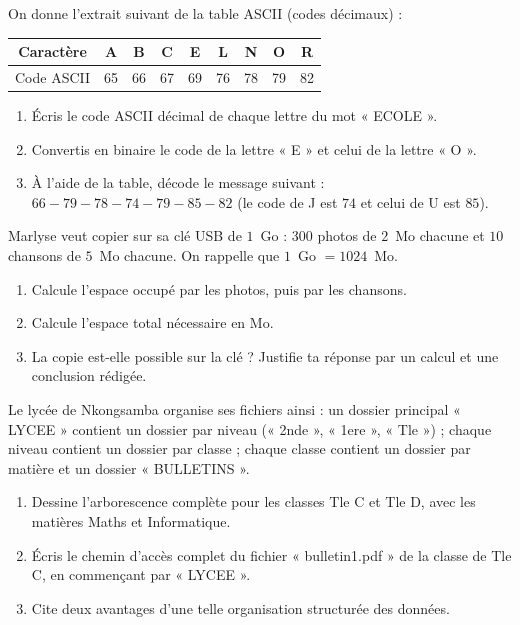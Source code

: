 \documentclass[11pt]{article}
\begin{document}
\begin{exercice}
On donne l'extrait suivant de la table ASCII (codes décimaux) :
\begin{center}
\begin{tabular}{|c|c|c|c|c|c|c|c|c|}
\hline
\rowcolor{popblueL} Caractère & A & B & C & E & L & N & O & R \\
\hline
Code ASCII & 65 & 66 & 67 & 69 & 76 & 78 & 79 & 82 \\
\hline
\end{tabular}
\end{center}
\begin{enumerate}
\item Écris le code ASCII décimal de chaque lettre du mot « ECOLE ».
\item Convertis en binaire le code de la lettre « E » et celui de la lettre « O ».
\item À l'aide de la table, décode le message suivant : $66 - 79 - 78 - 74 - 79 - 85 - 82$ (le code de J est $74$ et celui de U est $85$).
\end{enumerate}
\end{exercice}

\begin{exercice}
Marlyse veut copier sur sa clé USB de $1$~Go : $300$ photos de $2$~Mo chacune et $10$ chansons de $5$~Mo chacune. On rappelle que $1$~Go $= 1024$~Mo.
\begin{enumerate}
\item Calcule l'espace occupé par les photos, puis par les chansons.
\item Calcule l'espace total nécessaire en Mo.
\item La copie est-elle possible sur la clé ? Justifie ta réponse par un calcul et une conclusion rédigée.
\end{enumerate}
\end{exercice}

\begin{exercice}
Le lycée de Nkongsamba organise ses fichiers ainsi : un dossier principal « LYCEE » contient un dossier par niveau (« 2nde », « 1ere », « Tle ») ; chaque niveau contient un dossier par classe ; chaque classe contient un dossier par matière et un dossier « BULLETINS ».
\begin{enumerate}
\item Dessine l'arborescence complète pour les classes Tle C et Tle D, avec les matières Maths et Informatique.
\item Écris le chemin d'accès complet du fichier « bulletin1.pdf » de la classe de Tle C, en commençant par « LYCEE ».
\item Cite deux avantages d'une telle organisation structurée des données.
\end{enumerate}
\end{exercice}
\end{document}
